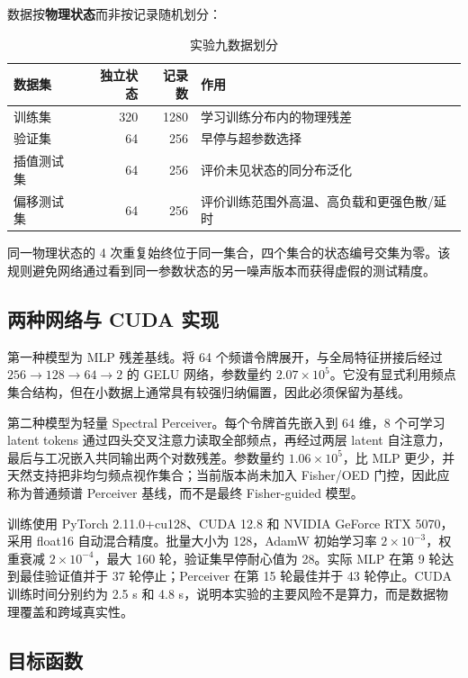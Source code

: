 \documentclass[UTF8,a4paper,12pt]{ctexart}
\begin{document}
数据按\textbf{物理状态}而非按记录随机划分：
\begin{table}[H]
\centering
\caption{实验九数据划分}
\begin{tabular}{lrrl}
\toprule
数据集 & 独立状态 & 记录数 & 作用 \\
\midrule
训练集 & 320 & 1280 & 学习训练分布内的物理残差 \\
验证集 & 64 & 256 & 早停与超参数选择 \\
插值测试集 & 64 & 256 & 评价未见状态的同分布泛化 \\
偏移测试集 & 64 & 256 & 评价训练范围外高温、高负载和更强色散/延时 \\
\bottomrule
\end{tabular}
\end{table}
同一物理状态的 4 次重复始终位于同一集合，四个集合的状态编号交集为零。该规则避免网络通过看到同一参数状态的另一噪声版本而获得虚假的测试精度。

\subsection{两种网络与 CUDA 实现}

第一种模型为 MLP 残差基线。将 64 个频谱令牌展开，与全局特征拼接后经过 $256\rightarrow128\rightarrow64\rightarrow2$ 的 GELU 网络，参数量约 $2.07\times10^5$。它没有显式利用频点集合结构，但在小数据上通常具有较强归纳偏置，因此必须保留为基线。

第二种模型为轻量 Spectral Perceiver。每个令牌首先嵌入到 64 维，8 个可学习 latent tokens 通过四头交叉注意力读取全部频点，再经过两层 latent 自注意力，最后与工况嵌入共同输出两个对数残差。参数量约 $1.06\times10^5$，比 MLP 更少，并天然支持把非均匀频点视作集合；当前版本尚未加入 Fisher/OED 门控，因此应称为普通频谱 Perceiver 基线，而不是最终 Fisher-guided 模型。

训练使用 PyTorch 2.11.0+cu128、CUDA 12.8 和 NVIDIA GeForce RTX 5070，采用 float16 自动混合精度。批量大小为 128，AdamW 初始学习率 $2\times10^{-3}$，权重衰减 $2\times10^{-4}$，最大 160 轮，验证集早停耐心值为 28。实际 MLP 在第 9 轮达到最佳验证值并于 37 轮停止；Perceiver 在第 15 轮最佳并于 43 轮停止。CUDA 训练时间分别约为 2.5 s 和 4.8 s，说明本实验的主要风险不是算力，而是数据物理覆盖和跨域真实性。

\subsection{目标函数}
\end{document}
